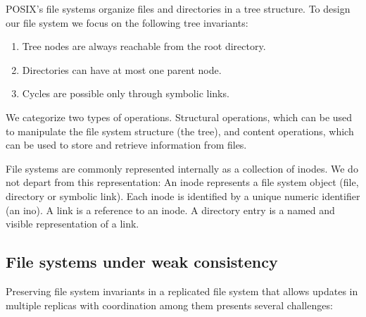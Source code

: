 \documentclass[sigconf,anonymous,10pt]{acmart}
\begin{document}
POSIX's file systems organize files and directories in a tree structure.
To design our file system we focus on the following tree invariants:

\begin{enumerate}
\item Tree nodes are always reachable from the root directory.
\item Directories can have at most one parent node.
\item Cycles are possible only through symbolic links.
\end{enumerate}

We categorize two types of operations.
Structural operations, which can be used to manipulate the file system
structure (the tree), and content operations,
which can be used to store and retrieve information from files.

File systems are commonly represented internally as a collection of inodes.
We do not depart from this representation:
An inode represents a file system object (file, directory or symbolic link).
Each inode is identified by a unique numeric identifier (an ino).
A link is a reference to an inode. A directory entry is a named and visible representation of a link.

\subsection{File systems under weak consistency}
\label{fs:weak}

Preserving file system invariants in a replicated file system
that allows updates in multiple replicas with coordination
among them presents several challenges:
\end{document}
